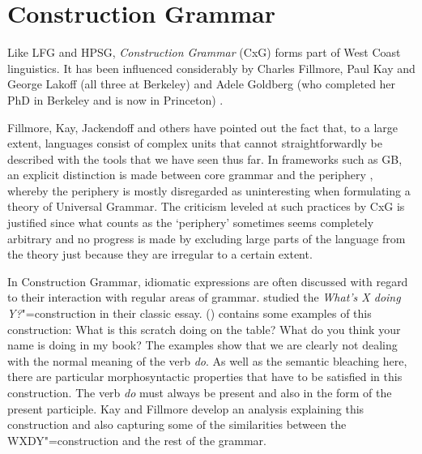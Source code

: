 
\chapter{Construction Grammar}
\label{Kapitel-CxG}

%
%
%
%


Like LFG and HPSG, \emph{Construction Grammar} (CxG) forms part of West Coast linguistics.
It has been influenced considerably by Charles Fillmore, Paul Kay and George Lakoff (all three at Berkeley) and Adele Goldberg
(who completed her PhD in Berkeley and is now in Princeton)
\citep*{Fillmore88a,FKoC88a,KF99a,Kay2002a,Kay2005a,Goldberg95a,Goldberg2006a}.

Fillmore, Kay, Jackendoff and others have pointed out the fact that, to a large extent, languages consist of complex units that cannot straightforwardly
be described with the tools that we have seen thus far. In frameworks such as GB, an explicit distinction is made between core grammar
and the periphery \citep[]{Chomsky81a}, whereby the periphery is mostly disregarded as uninteresting when formulating a theory
of Universal Grammar. The criticism leveled at such practices by CxG is justified since what counts as the `periphery' sometimes seems completely
arbitrary \citep{MuellerKernigkeit} and no progress is made by excluding large parts of the language
from the theory just because they are irregular to a certain extent.

In Construction Grammar, idiomatic expressions are often discussed with regard to their interaction
with regular areas of grammar. \citet{KF99a} studied the \emph{What's X doing Y?}"=construction in
their classic essay. () contains some examples of this construction: 
\eal
\ex What is this scratch doing on the table?
\ex What do you think your name is doing in my book?
\zl
The examples show that we are clearly not dealing with the normal meaning of the verb \emph{do}. As well as the semantic bleaching here,
there are particular morphosyntactic properties that have to be satisfied in this construction. The verb \emph{do} must always be present
and also in the form of the present participle. Kay and Fillmore develop an analysis explaining this construction and also capturing some
of the similarities between the WXDY"=construction and the rest of the grammar.

